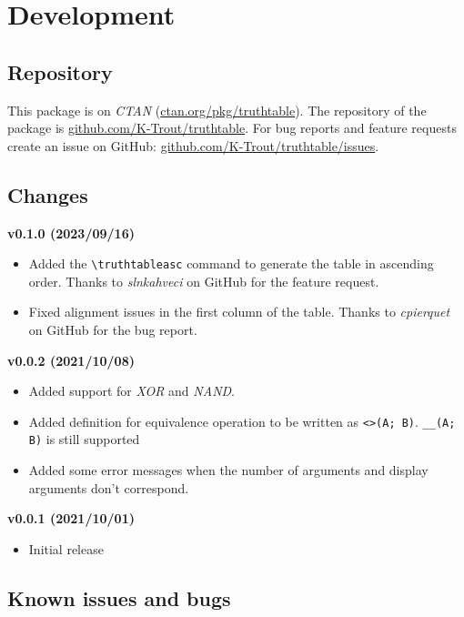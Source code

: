 \documentclass[a4paper]{article}
\begin{document}
\newpage

\section{Development}

\subsection{Repository}

This package is on \emph{CTAN} (\href{https://ctan.org/pkg/truthtable}{ctan.org/pkg/truthtable}). The repository of the package is \href{https://github.com/K-Trout/truthtable}{github.com/K-Trout/truthtable}. For bug reports and feature requests create an issue on GitHub: \href{https://github.com/K-Trout/truthtable/issues}{github.com/K-Trout/truthtable/issues}.

\subsection{Changes}

\textbf{v0.1.0 (2023/09/16)}
\begin{itemize}
    \item Added the \texttt{\textbackslash truthtableasc} command to generate the table in ascending order. Thanks to \emph{slnkahveci} on GitHub for the feature request.
    \item Fixed alignment issues in the first column of the table. Thanks to \emph{cpierquet} on GitHub for the bug report.
\end{itemize}
\textbf{v0.0.2 (2021/10/08)}

\begin{itemize}
    \item Added support for \emph{XOR} and \emph{NAND}.
    \item Added definition for equivalence operation to be written as \texttt{<>(A; B)}.  \texttt{\_\_(A; B)} is still supported
    \item Added some error messages when the number of arguments and display arguments don't correspond.
\end{itemize}
\textbf{v0.0.1 (2021/10/01)}

\begin{itemize}
    \item Initial release
\end{itemize}

\subsection{Known issues and bugs}
\end{document}
